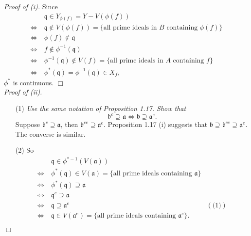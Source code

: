 \documentclass{article}
\begin{document}
\emph{Proof of (i).}
  Since
  \begin{align*}
    & \:
    \mathfrak{q} \in Y_{\phi(f)} = Y - V(\phi(f)) \\
    \Longleftrightarrow & \:
    \mathfrak{q} \not\in V(\phi(f)) = \{ \text{all prime ideals in $B$ containing $\phi(f)$} \} \\
    \Longleftrightarrow & \:
    \phi(f) \not\in \mathfrak{q} \\
    \Longleftrightarrow & \:
    f \not\in \phi^{-1}(\mathfrak{q}) \\
    \Longleftrightarrow & \:
    \phi^{-1}(\mathfrak{q}) \not\in V(f) = \{ \text{all prime ideals in $A$ containing $f$} \} \\
    \Longleftrightarrow & \:
    \phi^{*}(\mathfrak{q}) = \phi^{-1}(\mathfrak{q}) \in X_f,
  \end{align*}
  $\phi^{*}$ is continuous.
$\Box$ \\



\emph{Proof of (ii).}
\begin{enumerate}
\item[(1)]
  \emph{Use the same notation of Proposition 1.17.
  Show that}
  \[
    \mathfrak{b}^c \supseteq \mathfrak{a}
    \Longleftrightarrow
    \mathfrak{b} \supseteq \mathfrak{a}^e.
  \]
  Suppose $\mathfrak{b}^c \supseteq \mathfrak{a}$, then
  $\mathfrak{b}^{ce} \supseteq \mathfrak{a}^e$. Proposition 1.17 (i) suggests that
  $\mathfrak{b} \supseteq \mathfrak{b}^{ce} \supseteq \mathfrak{a}^e$.
  The converse is similar.

\item[(2)]
  So
  \begin{align*}
    & \:
    \mathfrak{q} \in \phi^{*-1}(V(\mathfrak{a})) \\
    \Longleftrightarrow & \:
    \phi^{*}(\mathfrak{q}) \in V(\mathfrak{a}) = \{ \text{all prime ideals containing $\mathfrak{a}$} \} \\
    \Longleftrightarrow & \:
    \phi^{*}(\mathfrak{q}) \supseteq \mathfrak{a} \\
    \Longleftrightarrow & \:
    \mathfrak{q}^c \supseteq \mathfrak{a} \\
    \Longleftrightarrow & \:
    \mathfrak{q} \supseteq \mathfrak{a}^e
      &(\text{(1)}) \\
    \Longleftrightarrow & \:
    \mathfrak{q} \in V(\mathfrak{a}^e) = \{ \text{all prime ideals containing $\mathfrak{a}^e$} \}.
  \end{align*}
\end{enumerate}
$\Box$ \\
\end{document}
